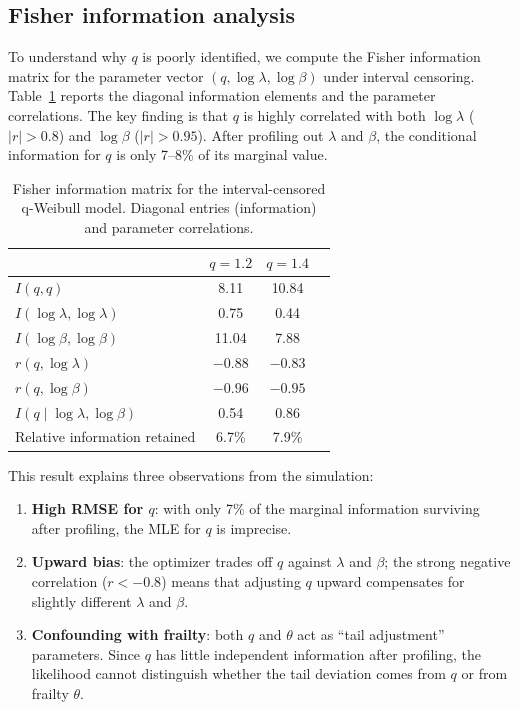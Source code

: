 \documentclass[12pt,a4paper]{article}
\begin{document}
\subsection{Fisher information analysis}

To understand why $q$ is poorly identified, we compute the Fisher information matrix for the parameter vector $(q, \log\lambda, \log\beta)$ under interval censoring. Table~\ref{tab:fisher} reports the diagonal information elements and the parameter correlations. The key finding is that $q$ is highly correlated with both $\log\lambda$ ($|r|>0.8$) and $\log\beta$ ($|r|>0.95$). After profiling out $\lambda$ and $\beta$, the conditional information for $q$ is only 7--8\% of its marginal value.

\begin{table}[ht]
\centering
\caption{Fisher information matrix for the interval-censored q-Weibull model. Diagonal entries (information) and parameter correlations.}
\begin{tabular}{lccc}
\toprule
& $q=1.2$ & $q=1.4$ \\
\midrule
$I(q,q)$ & 8.11 & 10.84 \\
$I(\log\lambda,\log\lambda)$ & 0.75 & 0.44 \\
$I(\log\beta,\log\beta)$ & 11.04 & 7.88 \\
$r(q, \log\lambda)$ & $-0.88$ & $-0.83$ \\
$r(q, \log\beta)$ & $-0.96$ & $-0.95$ \\
\midrule
$I(q \mid \log\lambda,\log\beta)$ & 0.54 & 0.86 \\
Relative information retained & 6.7\% & 7.9\% \\
\bottomrule
\end{tabular}
\label{tab:fisher}
\end{table}

This result explains three observations from the simulation:
\begin{enumerate}
\item \textbf{High RMSE for $q$}: with only 7\% of the marginal information surviving after profiling, the MLE for $q$ is imprecise.
\item \textbf{Upward bias}: the optimizer trades off $q$ against $\lambda$ and $\beta$; the strong negative correlation ($r<-0.8$) means that adjusting $q$ upward compensates for slightly different $\lambda$ and $\beta$.
\item \textbf{Confounding with frailty}: both $q$ and $\theta$ act as ``tail adjustment'' parameters. Since $q$ has little independent information after profiling, the likelihood cannot distinguish whether the tail deviation comes from $q$ or from frailty $\theta$.
\end{enumerate}
\end{document}

